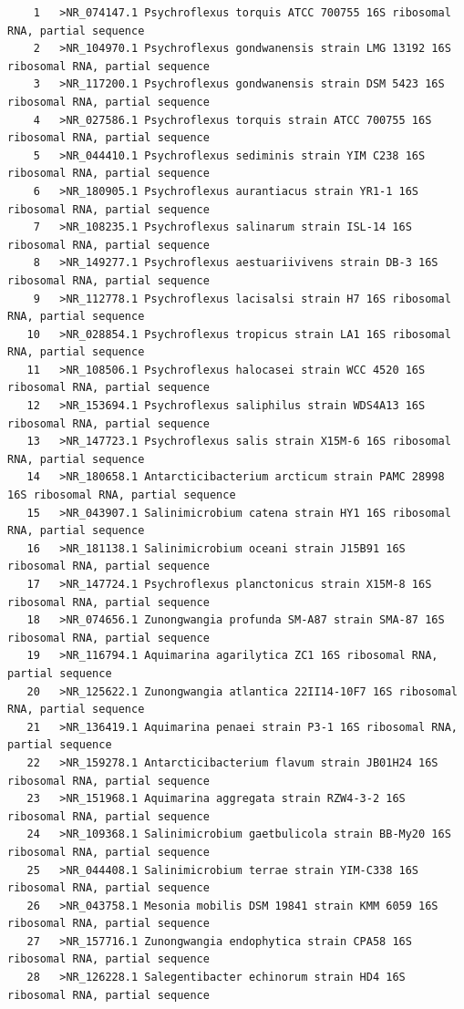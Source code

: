 \documentclass{article}
\begin{document}
\begin{verbatim}
    1	>NR_074147.1 Psychroflexus torquis ATCC 700755 16S ribosomal RNA, partial sequence
    2	>NR_104970.1 Psychroflexus gondwanensis strain LMG 13192 16S ribosomal RNA, partial sequence
    3	>NR_117200.1 Psychroflexus gondwanensis strain DSM 5423 16S ribosomal RNA, partial sequence
    4	>NR_027586.1 Psychroflexus torquis strain ATCC 700755 16S ribosomal RNA, partial sequence
    5	>NR_044410.1 Psychroflexus sediminis strain YIM C238 16S ribosomal RNA, partial sequence
    6	>NR_180905.1 Psychroflexus aurantiacus strain YR1-1 16S ribosomal RNA, partial sequence
    7	>NR_108235.1 Psychroflexus salinarum strain ISL-14 16S ribosomal RNA, partial sequence
    8	>NR_149277.1 Psychroflexus aestuariivivens strain DB-3 16S ribosomal RNA, partial sequence
    9	>NR_112778.1 Psychroflexus lacisalsi strain H7 16S ribosomal RNA, partial sequence
   10	>NR_028854.1 Psychroflexus tropicus strain LA1 16S ribosomal RNA, partial sequence
   11	>NR_108506.1 Psychroflexus halocasei strain WCC 4520 16S ribosomal RNA, partial sequence
   12	>NR_153694.1 Psychroflexus saliphilus strain WDS4A13 16S ribosomal RNA, partial sequence
   13	>NR_147723.1 Psychroflexus salis strain X15M-6 16S ribosomal RNA, partial sequence
   14	>NR_180658.1 Antarcticibacterium arcticum strain PAMC 28998 16S ribosomal RNA, partial sequence
   15	>NR_043907.1 Salinimicrobium catena strain HY1 16S ribosomal RNA, partial sequence
   16	>NR_181138.1 Salinimicrobium oceani strain J15B91 16S ribosomal RNA, partial sequence
   17	>NR_147724.1 Psychroflexus planctonicus strain X15M-8 16S ribosomal RNA, partial sequence
   18	>NR_074656.1 Zunongwangia profunda SM-A87 strain SMA-87 16S ribosomal RNA, partial sequence
   19	>NR_116794.1 Aquimarina agarilytica ZC1 16S ribosomal RNA, partial sequence
   20	>NR_125622.1 Zunongwangia atlantica 22II14-10F7 16S ribosomal RNA, partial sequence
   21	>NR_136419.1 Aquimarina penaei strain P3-1 16S ribosomal RNA, partial sequence
   22	>NR_159278.1 Antarcticibacterium flavum strain JB01H24 16S ribosomal RNA, partial sequence
   23	>NR_151968.1 Aquimarina aggregata strain RZW4-3-2 16S ribosomal RNA, partial sequence
   24	>NR_109368.1 Salinimicrobium gaetbulicola strain BB-My20 16S ribosomal RNA, partial sequence
   25	>NR_044408.1 Salinimicrobium terrae strain YIM-C338 16S ribosomal RNA, partial sequence
   26	>NR_043758.1 Mesonia mobilis DSM 19841 strain KMM 6059 16S ribosomal RNA, partial sequence
   27	>NR_157716.1 Zunongwangia endophytica strain CPA58 16S ribosomal RNA, partial sequence
   28	>NR_126228.1 Salegentibacter echinorum strain HD4 16S ribosomal RNA, partial sequence

\end{verbatim}
\end{document}
